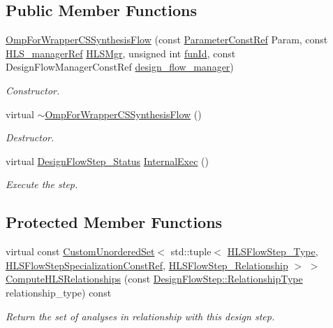 \subsection*{Public Member Functions}
\begin{DoxyCompactItemize}
\item 
\hyperlink{classOmpForWrapperCSSynthesisFlow_a1b1c9f55d63acf1140c8c04c4aad9df1}{Omp\+For\+Wrapper\+C\+S\+Synthesis\+Flow} (const \hyperlink{Parameter_8hpp_a37841774a6fcb479b597fdf8955eb4ea}{Parameter\+Const\+Ref} Param, const \hyperlink{hls__manager_8hpp_acd3842b8589fe52c08fc0b2fcc813bfe}{H\+L\+S\+\_\+manager\+Ref} \hyperlink{classHLS__step_ade85003a99d34134418451ddc46a18e9}{H\+L\+S\+Mgr}, unsigned int \hyperlink{classHLSFunctionStep_a3e6434fd86c698b0c70520b859bff5b0}{fun\+Id}, const Design\+Flow\+Manager\+Const\+Ref \hyperlink{classDesignFlowStep_ab770677ddf087613add30024e16a5554}{design\+\_\+flow\+\_\+manager})
\begin{DoxyCompactList}\small\item\em Constructor. \end{DoxyCompactList}\item 
virtual \hyperlink{classOmpForWrapperCSSynthesisFlow_a991a413f1d4691d49d0e71a8ccf6c189}{$\sim$\+Omp\+For\+Wrapper\+C\+S\+Synthesis\+Flow} ()
\begin{DoxyCompactList}\small\item\em Destructor. \end{DoxyCompactList}\item 
virtual \hyperlink{design__flow__step_8hpp_afb1f0d73069c26076b8d31dbc8ebecdf}{Design\+Flow\+Step\+\_\+\+Status} \hyperlink{classOmpForWrapperCSSynthesisFlow_adf4ac0c27066d673830c29b594b80b4e}{Internal\+Exec} ()
\begin{DoxyCompactList}\small\item\em Execute the step. \end{DoxyCompactList}\end{DoxyCompactItemize}
\subsection*{Protected Member Functions}
\begin{DoxyCompactItemize}
\item 
virtual const \hyperlink{classCustomUnorderedSet}{Custom\+Unordered\+Set}$<$ std\+::tuple$<$ \hyperlink{hls__step_8hpp_ada16bc22905016180e26fc7e39537f8d}{H\+L\+S\+Flow\+Step\+\_\+\+Type}, \hyperlink{hls__step_8hpp_a5fdd2edf290c196531d21d68e13f0e74}{H\+L\+S\+Flow\+Step\+Specialization\+Const\+Ref}, \hyperlink{hls__step_8hpp_a3ad360b9b11e6bf0683d5562a0ceb169}{H\+L\+S\+Flow\+Step\+\_\+\+Relationship} $>$ $>$ \hyperlink{classOmpForWrapperCSSynthesisFlow_a63a3f829cae1a393afe534a95d2b1de0}{Compute\+H\+L\+S\+Relationships} (const \hyperlink{classDesignFlowStep_a723a3baf19ff2ceb77bc13e099d0b1b7}{Design\+Flow\+Step\+::\+Relationship\+Type} relationship\+\_\+type) const
\begin{DoxyCompactList}\small\item\em Return the set of analyses in relationship with this design step. \end{DoxyCompactList}\end{DoxyCompactItemize}
